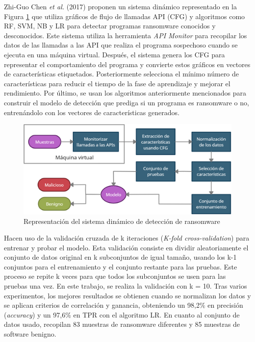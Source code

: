 \newpage

Zhi-Guo Chen \textit{et al.} (2017) \cite{flow} proponen un sistema dinámico representado en la Figura \ref{fig:flow} que utiliza gráficos de flujo de llamadas \gls{API} (\gls{CFG}) y algoritmos como \gls{RF}, \gls{SVM}, \gls{NB} y \gls{LR} para detectar programas ransomware conocidos y desconocidos. Este sistema utiliza la herramienta \textit{API Monitor} para recopilar los datos de las llamadas a las \gls{API} que realiza el programa sospechoso cuando se ejecuta en una máquina virtual. Después, el sistema genera los \gls{CFG} para representar el comportamiento del programa y convierte estos gráficos en vectores de características etiquetados. Posteriormente selecciona el mínimo número de características para reducir el tiempo de la fase de aprendizaje y mejorar el rendimiento. Por último, se usan los algoritmos anteriormente mencionados para construir el modelo de detección que prediga si un programa es ransomware o no, entrenándolo con los vectores de características generados. 

\begin{figure}[h!]
\begin{center}
\includegraphics[width=0.9\linewidth]{images/flow.png}
\end{center}
\caption{Representación del sistema dinámico de detección de ransomware \cite{flow}}
\label{fig:flow}
\end{figure}

Hacen uso de la validación cruzada de k iteraciones (\textit{K-fold cross-validation}) para entrenar y probar el modelo. Esta validación consiste en dividir aleatoriamente el conjunto de datos original en k subconjuntos de igual tamaño, usando los k-1 conjuntos para el entrenamiento y el conjunto restante para las pruebas. Este proceso se repite k veces para que todos los subconjuntos se usen para las pruebas una vez. En este trabajo, se realiza la validación con k = 10. Tras varios experimentos, los mejores resultados se obtienen cuando se normalizan los datos y se aplican criterios de correlación y ganancia, obteniendo un 98,2\% en precisión (\textit{accuracy}) y un 97,6\% en \gls{TPR} con el algoritmo \gls{LR}. En cuanto al conjunto de datos usado, recopilan 83 muestras de ransomware diferentes y 85 muestras de software benigno.


